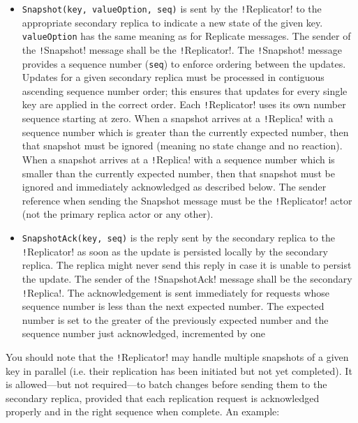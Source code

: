 \documentclass{article}
\begin{document}
\begin{itemize}
    \item \texttt{Snapshot(key, valueOption, seq)} is sent by the \texttt!Replicator! to the appropriate secondary replica to indicate a new state of the given key. \texttt{valueOption} has the same meaning as for Replicate messages. The sender of the \texttt!Snapshot! message shall be the \texttt!Replicator!. The \texttt!Snapshot! message provides a sequence number (\texttt{seq}) to enforce ordering between the updates. Updates for a given secondary replica must be processed in contiguous ascending sequence number order; this ensures that updates for every single key are applied in the correct order. Each \texttt!Replicator! uses its own number sequence starting at zero. When a snapshot arrives at a \texttt!Replica! with a sequence number which is greater than the currently expected number, then that snapshot must be ignored (meaning no state change and no reaction). When a snapshot arrives at a \texttt!Replica! with a sequence number which is smaller than the currently expected number, then that snapshot must be ignored and immediately acknowledged as described below. The sender reference when sending the Snapshot message must be the \texttt!Replicator! actor (not the primary replica actor or any other).
    \item \texttt{SnapshotAck(key, seq)} is the reply sent by the secondary replica to the \texttt!Replicator! as soon as the update is persisted locally by the secondary replica. The replica might never send this reply in case it is unable to persist the update. The sender of the \texttt!SnapshotAck! message shall be the secondary \texttt!Replica!. The acknowledgement is sent immediately for requests whose sequence number is less than the next expected number. The expected number is set to the greater of the previously expected number and the sequence number just acknowledged, incremented by one
\end{itemize}

You should note that the \texttt!Replicator! may handle multiple snapshots of a given key in parallel (i.e. their replication has been initiated but not yet completed). It is allowed—but not required—to batch changes before sending them to the secondary replica, provided that each replication request is acknowledged properly and in the right sequence when complete. An example:
\end{document}
